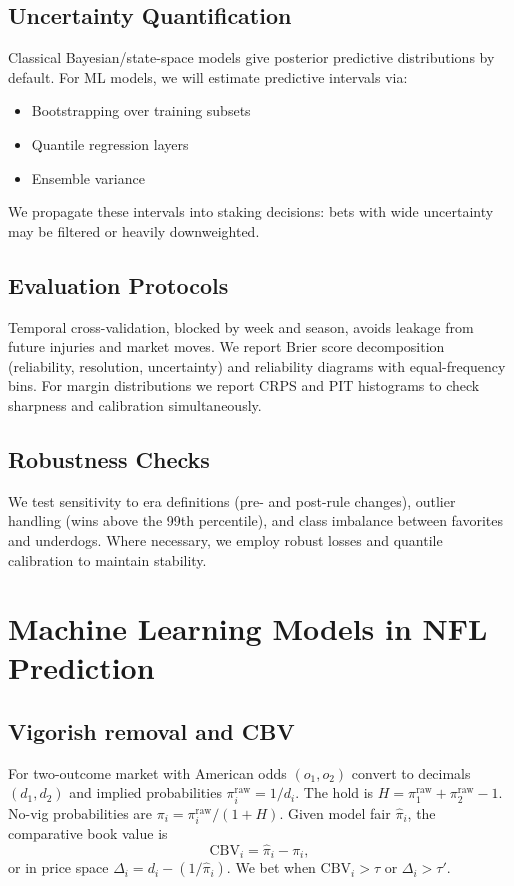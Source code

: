 \subsection{Uncertainty Quantification}
Classical Bayesian/state-space models give posterior predictive distributions by default.  
For ML models, we will estimate predictive intervals via:
\begin{itemize}
  \item Bootstrapping over training subsets
  \item Quantile regression layers
  \item Ensemble variance
\end{itemize}
We propagate these intervals into staking decisions: bets with wide uncertainty may be filtered or heavily downweighted.

\subsection{Evaluation Protocols}
Temporal cross-validation, blocked by week and season, avoids leakage from future injuries and market moves. We report Brier score decomposition (reliability, resolution, uncertainty) and reliability diagrams with equal-frequency bins. For margin distributions we report CRPS and PIT histograms to check sharpness and calibration simultaneously.

\subsection{Robustness Checks}
We test sensitivity to era definitions (pre- and post-rule changes), outlier handling (wins above the 99th percentile), and class imbalance between favorites and underdogs. Where necessary, we employ robust losses and quantile calibration to maintain stability.

\section{Machine Learning Models in NFL Prediction}
\label{sec:ml}

\subsection{Vigorish removal and CBV}\label{subsec:vig-cbv-lit}
For two-outcome market with American odds $(o_1,o_2)$ convert to decimals $(d_1,d_2)$ and implied
probabilities $\pi_i^{\mathrm{raw}}=1/d_i$. The hold is $H=\pi_1^{\mathrm{raw}}+\pi_2^{\mathrm{raw}}-1$.
No-vig probabilities are $\pi_i=\pi_i^{\mathrm{raw}}/(1+H)$. Given model fair $\hat\pi_i$, the
comparative book value is
\[
\mathrm{CBV}_i=\hat\pi_i-\pi_i,
\]
or in price space $\Delta_i = d_i - (1/\hat\pi_i)$. We bet when $\mathrm{CBV}_i>\tau$ or $\Delta_i>\tau'$.

